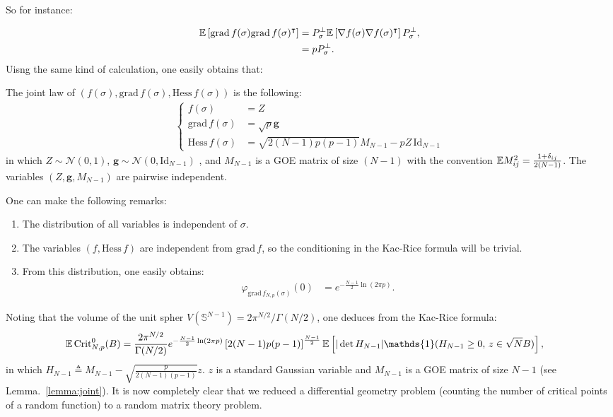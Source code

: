 \documentclass[amsmath,amssymb,nofootinbib,prd]{article}
\begin{document}
	So for instance:
	
	\begin{align*}
	\mathbb{E} \left[\mathrm{grad}\, f(\sigma) \mathrm{grad}\, f(\sigma)^\intercal \right] &=  P_\sigma^\perp\mathbb{E} \left[\nabla f(\sigma) \nabla f(\sigma)^\intercal \right] P_\sigma^\perp, \\
	&= p  P_\sigma^\perp.
	\end{align*}
	Uisng the same kind of calculation, one easily obtains that:
	\begin{lemma}\label{lemma:joint}
	The joint law of $(f(\sigma),\mathrm{grad}\, f(\sigma),\mathrm{Hess}\, f(\sigma))$ is the following:
	\begin{align}
	\begin{cases}
	f(\sigma) &= Z \\
	\mathrm{grad}\, f(\sigma) &= \sqrt{p} \bm{g} \\
	\mathrm{Hess}\, f(\sigma) &= \sqrt{2 (N-1)p(p-1)} M_{N-1} - p Z \, \mathrm{Id}_{N-1}
	\end{cases}
	\end{align}
	in which $Z \sim \mathcal{N}(0,1)$, $\bm{g} \sim \mathcal{N}(0,\mathrm{Id}_{N-1})$ , and $M_{N-1}$ is a GOE matrix of size $(N-1)$ with the convention $\mathbb{E} M_{ij}^2 = \frac{1+\delta_{ij}}{2(N-1)}$. The variables $(Z,\bm{g},M_{N-1})$ are pairwise independent.
	\end{lemma}
	
	One can make the following remarks:
	\begin{enumerate}
	\item The distribution of all variables is independent of $\sigma$.
	\item The variables $(f,\mathrm{Hess}\, f)$ are independent from $\mathrm{grad}\,f$, so the conditioning in the Kac-Rice formula will be trivial.
	\item From this distribution, one easily obtains:
	\begin{align*}
	 \varphi_{\mathrm{grad}\, f_{N,p}(\sigma)}(0) &= e^{- \frac{N-1}{2} \ln (2 \pi p)}.
	\end{align*}
	\end{enumerate}
	
	Noting that the volume of the unit spher $V(\mathbb{S}^{N-1}) = 2 \pi^{N/2} / \Gamma(N/2)$, one deduces from the Kac-Rice formula:
	\begin{align}\label{eq:0}
	\EE \, \mathrm{Crit}_{N,p}^0(B) &= \frac{2 \pi^{N/2}}{\Gamma(N/2)}e^{- \frac{N-1}{2} \ln (2 \pi p)} \left[2 (N-1)p(p-1)\right]^{\frac{N-1}{2}} \EE \left[|\det H_{N-1}| \mathds{1}(H_{N-1} \geq 0, \, z \in \sqrt{N} B)\right],
	\end{align}
	in which $H_{N-1} \triangleq M_{N-1} - \sqrt{\frac{p}{2 (N-1)(p-1)}} z$. $z$ is a standard Gaussian variable and $M_{N-1}$ is a GOE matrix of size $N-1$ (see Lemma.~\ref{lemma:joint}). It is now completely clear that we reduced a differential geometry problem (counting the number of critical points of a random function) to a random matrix theory problem. 
	
\end{document}
